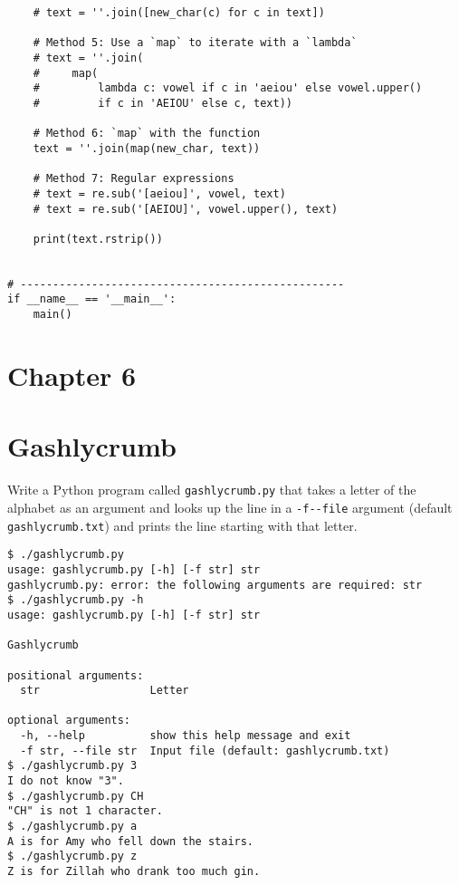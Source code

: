 \documentclass[]{article}
\begin{document}
\begin{verbatim}
    # text = ''.join([new_char(c) for c in text])

    # Method 5: Use a `map` to iterate with a `lambda`
    # text = ''.join(
    #     map(
    #         lambda c: vowel if c in 'aeiou' else vowel.upper()
    #         if c in 'AEIOU' else c, text))

    # Method 6: `map` with the function
    text = ''.join(map(new_char, text))

    # Method 7: Regular expressions
    # text = re.sub('[aeiou]', vowel, text)
    # text = re.sub('[AEIOU]', vowel.upper(), text)

    print(text.rstrip())


# --------------------------------------------------
if __name__ == '__main__':
    main()
\end{verbatim}

\pagebreak

\hypertarget{chapter-6}{%
\section{Chapter 6}\label{chapter-6}}

\hypertarget{gashlycrumb}{%
\section{Gashlycrumb}\label{gashlycrumb}}

Write a Python program called \texttt{gashlycrumb.py} that takes a
letter of the alphabet as an argument and looks up the line in a
\texttt{-f\textbar{}-\/-file} argument (default
\texttt{gashlycrumb.txt}) and prints the line starting with that letter.

\begin{verbatim}
$ ./gashlycrumb.py
usage: gashlycrumb.py [-h] [-f str] str
gashlycrumb.py: error: the following arguments are required: str
$ ./gashlycrumb.py -h
usage: gashlycrumb.py [-h] [-f str] str

Gashlycrumb

positional arguments:
  str                 Letter

optional arguments:
  -h, --help          show this help message and exit
  -f str, --file str  Input file (default: gashlycrumb.txt)
$ ./gashlycrumb.py 3
I do not know "3".
$ ./gashlycrumb.py CH
"CH" is not 1 character.
$ ./gashlycrumb.py a
A is for Amy who fell down the stairs.
$ ./gashlycrumb.py z
Z is for Zillah who drank too much gin.
\end{verbatim}
\end{document}
